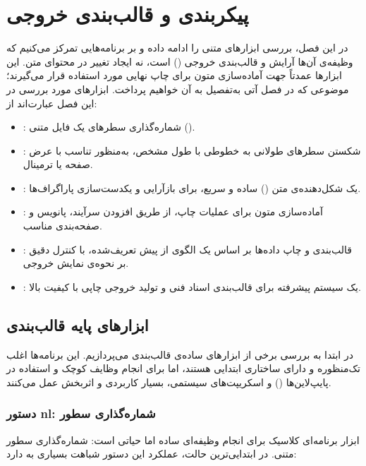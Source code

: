 \chapter{پیکربندی و قالب‌بندی خروجی}

در این فصل، بررسی ابزارهای متنی را ادامه داده و بر برنامه‌هایی تمرکز می‌کنیم که وظیفه‌ی آن‌ها آرایش و قالب‌بندی خروجی () است، نه ایجاد تغییر در محتوای متن. این ابزارها عمدتاً جهت آماده‌سازی متون برای چاپ نهایی مورد استفاده قرار می‌گیرند؛ موضوعی که در فصل آتی به‌تفصیل به آن خواهیم پرداخت. ابزارهای مورد بررسی در این فصل عبارت‌اند از:

\begin{itemize}
  \item {}: شماره‌گذاری سطرهای یک فایل متنی ().
  \item {}: شکستن سطرهای طولانی به خطوطی با طول مشخص، به‌منظور تناسب با عرض صفحه یا ترمینال.
  \item {}: یک شکل‌دهنده‌ی متن () ساده و سریع، برای بازآرایی و یکدست‌سازی پاراگراف‌ها.
  \item {}: آماده‌سازی متون برای عملیات چاپ، از طریق افزودن سرآیند، پانویس و صفحه‌بندی مناسب.
  \item {}: قالب‌بندی و چاپ داده‌ها بر اساس یک الگوی از پیش تعریف‌شده، با کنترل دقیق بر نحوه‌ی نمایش خروجی.
  \item {}: یک سیستم پیشرفته برای قالب‌بندی اسناد فنی و تولید خروجی چاپی با کیفیت بالا.
\end{itemize}

\section{ابزارهای پایه قالب‌بندی}

در ابتدا به بررسی برخی از ابزارهای ساده‌ی قالب‌بندی می‌پردازیم. این برنامه‌ها اغلب تک‌منظوره و دارای ساختاری ابتدایی هستند، اما برای انجام وظایف کوچک و استفاده در پایپ‌لاین‌ها () و اسکریپت‌های سیستمی، بسیار کاربردی و اثربخش عمل می‌کنند.

\subsection{دستور nl: شماره‌گذاری سطور}

ابزار  برنامه‌ای کلاسیک برای انجام وظیفه‌ای ساده اما حیاتی است: شماره‌گذاری سطور متنی. در ابتدایی‌ترین حالت، عملکرد این دستور شباهت بسیاری به  دارد:

